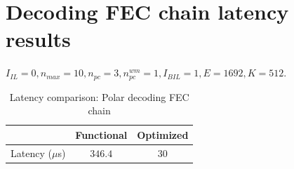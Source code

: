 \section{Decoding FEC chain latency results}

$I_{IL} = 0, n_{max} = 10, n_{pc} = 3 ,n_{pc}^{wm} = 1, I_{BIL} = 1, E = 1692, K = 512$.
\begin{table}[!h]
	\begin{center}
		\caption{Latency comparison: Polar decoding FEC chain}
		\label{tab:decodingFECChainLatency}
		\begin{tabular}{c|c|c} %
			\textbf{ } & Functional & Optimized \\
			\hline
			Latency ($\mu$s) & $346.4$ & $30$\\
		\end{tabular}
	\end{center}
\end{table}
